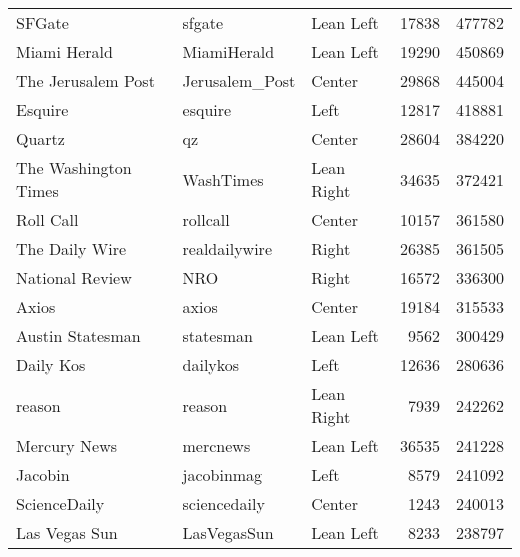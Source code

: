 \begin{tabular}{lllrr}
                                   SFGate &           sfgate &     Lean Left &             17838 &     477782 \\
                             Miami Herald &      MiamiHerald &     Lean Left &             19290 &     450869 \\
                       The Jerusalem Post &   Jerusalem\_Post &        Center &             29868 &     445004 \\
                                  Esquire &          esquire &          Left &             12817 &     418881 \\
                                   Quartz &               qz &        Center &             28604 &     384220 \\
                     The Washington Times &        WashTimes &    Lean Right &             34635 &     372421 \\
                                Roll Call &         rollcall &        Center &             10157 &     361580 \\
                           The Daily Wire &    realdailywire &         Right &             26385 &     361505 \\
                          National Review &              NRO &         Right &             16572 &     336300 \\
                                    Axios &            axios &        Center &             19184 &     315533 \\
                         Austin Statesman &        statesman &     Lean Left &              9562 &     300429 \\
                                Daily Kos &         dailykos &          Left &             12636 &     280636 \\
                                   reason &           reason &    Lean Right &              7939 &     242262 \\
                             Mercury News &         mercnews &     Lean Left &             36535 &     241228 \\
                                  Jacobin &       jacobinmag &          Left &              8579 &     241092 \\
                             ScienceDaily &     sciencedaily &        Center &              1243 &     240013 \\
                            Las Vegas Sun &      LasVegasSun &     Lean Left &              8233 &     238797 \\

\end{tabular}
